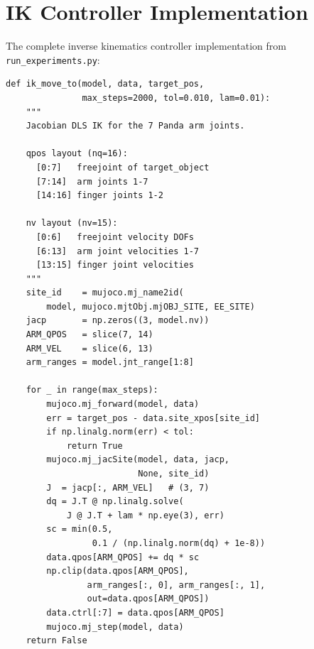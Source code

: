 \documentclass[11pt,a4paper]{report}
\begin{document}
\chapter{IK Controller Implementation}
\label{app:ik_code}

The complete inverse kinematics controller implementation from \texttt{run\_experiments.py}:

\begin{lstlisting}[caption={Damped Least Squares IK controller.},label={lst:ik_full}]
def ik_move_to(model, data, target_pos,
               max_steps=2000, tol=0.010, lam=0.01):
    """
    Jacobian DLS IK for the 7 Panda arm joints.

    qpos layout (nq=16):
      [0:7]   freejoint of target_object
      [7:14]  arm joints 1-7
      [14:16] finger joints 1-2

    nv layout (nv=15):
      [0:6]   freejoint velocity DOFs
      [6:13]  arm joint velocities 1-7
      [13:15] finger joint velocities
    """
    site_id    = mujoco.mj_name2id(
        model, mujoco.mjtObj.mjOBJ_SITE, EE_SITE)
    jacp       = np.zeros((3, model.nv))
    ARM_QPOS   = slice(7, 14)
    ARM_VEL    = slice(6, 13)
    arm_ranges = model.jnt_range[1:8]

    for _ in range(max_steps):
        mujoco.mj_forward(model, data)
        err = target_pos - data.site_xpos[site_id]
        if np.linalg.norm(err) < tol:
            return True
        mujoco.mj_jacSite(model, data, jacp,
                          None, site_id)
        J  = jacp[:, ARM_VEL]   # (3, 7)
        dq = J.T @ np.linalg.solve(
            J @ J.T + lam * np.eye(3), err)
        sc = min(0.5,
                 0.1 / (np.linalg.norm(dq) + 1e-8))
        data.qpos[ARM_QPOS] += dq * sc
        np.clip(data.qpos[ARM_QPOS],
                arm_ranges[:, 0], arm_ranges[:, 1],
                out=data.qpos[ARM_QPOS])
        data.ctrl[:7] = data.qpos[ARM_QPOS]
        mujoco.mj_step(model, data)
    return False
\end{lstlisting}
\end{document}

